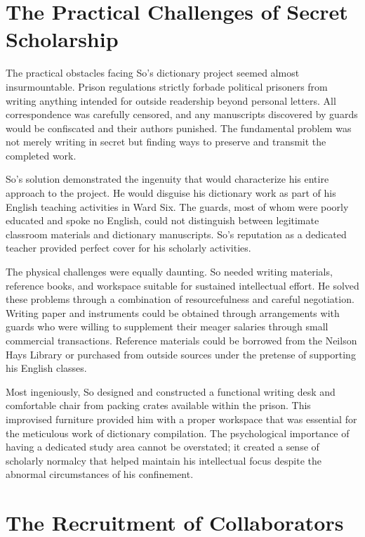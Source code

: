 \documentclass[
  Letterpaper,
]{scrbook}
\begin{document}
\section{The Practical Challenges of Secret
Scholarship}\label{the-practical-challenges-of-secret-scholarship}

The practical obstacles facing So's dictionary project seemed almost
insurmountable. Prison regulations strictly forbade political prisoners
from writing anything intended for outside readership beyond personal
letters. All correspondence was carefully censored, and any manuscripts
discovered by guards would be confiscated and their authors punished.
The fundamental problem was not merely writing in secret but finding
ways to preserve and transmit the completed work.

So's solution demonstrated the ingenuity that would characterize his
entire approach to the project. He would disguise his dictionary work as
part of his English teaching activities in Ward Six. The guards, most of
whom were poorly educated and spoke no English, could not distinguish
between legitimate classroom materials and dictionary manuscripts. So's
reputation as a dedicated teacher provided perfect cover for his
scholarly activities.

The physical challenges were equally daunting. So needed writing
materials, reference books, and workspace suitable for sustained
intellectual effort. He solved these problems through a combination of
resourcefulness and careful negotiation. Writing paper and instruments
could be obtained through arrangements with guards who were willing to
supplement their meager salaries through small commercial transactions.
Reference materials could be borrowed from the Neilson Hays Library or
purchased from outside sources under the pretense of supporting his
English classes.

Most ingeniously, So designed and constructed a functional writing desk
and comfortable chair from packing crates available within the prison.
This improvised furniture provided him with a proper workspace that was
essential for the meticulous work of dictionary compilation. The
psychological importance of having a dedicated study area cannot be
overstated; it created a sense of scholarly normalcy that helped
maintain his intellectual focus despite the abnormal circumstances of
his confinement.

\section{The Recruitment of
Collaborators}\label{the-recruitment-of-collaborators}
\end{document}
